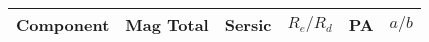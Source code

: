 \documentclass{standalone}
\begin{document}
\begin{tabular}{|c|c|c|c|c|c|} \toprule
Component & Mag Total & Sersic & $R_e/R_d$&PA & $a/b$\\  \midrule
\hline 
\end{tabular}
\end{document}

